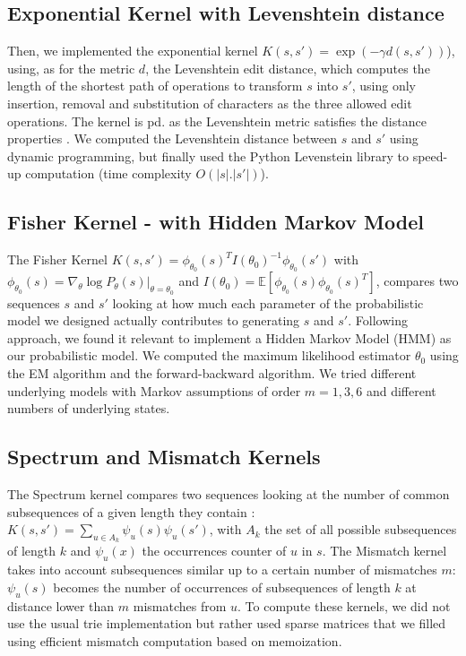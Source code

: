 \documentclass[11pt,twocolumn,letterpaper]{article}
\begin{document}
\subsection{Exponential Kernel with Levenshtein distance}

Then, we implemented the exponential kernel $K(s,s') = \exp (- \gamma d(s,s'))$), using, as for the metric $d$, the Levenshtein edit distance, which computes the length of the shortest path of operations to transform $s$ into $s'$, using only insertion, removal and substitution of characters as the three allowed edit operations. The kernel is pd. as the Levenshtein metric satisfies the distance properties \cite{Xu2004KernelsBO}. We computed the Levenshtein distance between $s$ and $s'$ using dynamic programming, but finally used the Python Levenstein library to speed-up computation (time complexity $O(|s|.|s'|)$).

\subsection{Fisher Kernel - with Hidden Markov Model}

The Fisher Kernel $K(s,s') = \phi_{\theta_0}(s)^T I(\theta_0)^{-1}\phi_{\theta_0}(s')$ with $\phi_{\theta_0}(s) = \nabla_{\theta} \log P_{\theta}(s)|_{\theta=\theta_0}$ and $I(\theta_0) = \mathbb{E}[\phi_{\theta_0}(s)\phi_{\theta_0}(s)^T]$, compares two sequences $s$ and $s'$ looking at how much each parameter of the probabilistic model we designed actually contributes to generating $s$ and $s'$. Following \cite{Tsuda} approach, we found it relevant to implement a Hidden Markov Model (HMM) as our probabilistic model. We computed the maximum likelihood estimator $\theta_0$ using the EM algorithm and the forward-backward algorithm. We tried different underlying models with Markov assumptions of order $m=1, 3, 6$ and different numbers of underlying states.

\subsection{Spectrum and Mismatch Kernels}

The Spectrum kernel compares two sequences looking at the number of common subsequences of a given length they contain : $K(s,s') = \sum_{u \in A_k} \psi_u(s) \psi_u(s')$, with $A_k$ the set of all possible subsequences of length $k$ and $\psi_u(x)$ the occurrences counter of $u$ in $s$. The Mismatch kernel \cite{Leslie_w.s.:mismatch} takes into account subsequences similar up to a certain number of mismatches $m$: $\psi_u(s)$ becomes the number of occurrences of subsequences of length $k$ at distance lower than $m$ mismatches from $u$. To compute these kernels, we did not use the usual trie implementation but rather used sparse matrices that we filled using efficient mismatch computation based on memoization.
\end{document}
